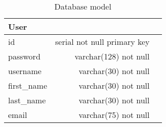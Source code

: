 \begin{table}[!htp]\centering
    \caption{Database model}\label{tab:dbModel}
    \scriptsize
    \begin{tabular}{lrr}\toprule
        User        &                             \\\midrule
        id          & serial not null primary key \\
        password    & varchar(128) not null       \\
        username    & varchar(30) not null        \\
        first\_name & varchar(30) not null        \\
        last\_name  & varchar(30) not null        \\
        email       & varchar(75) not null        \\
        \bottomrule
    \end{tabular}
\end{table}
